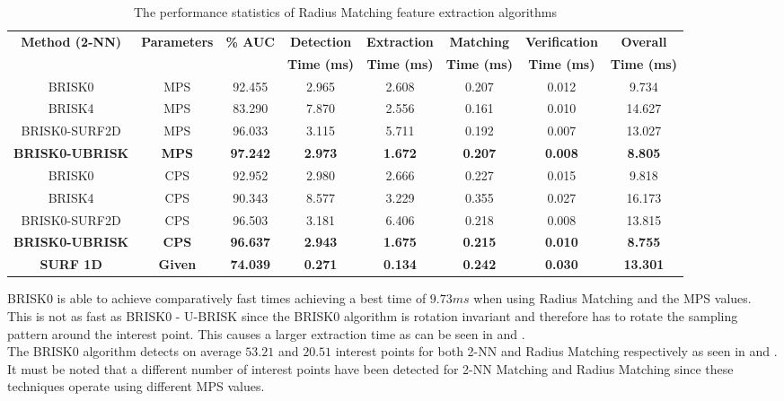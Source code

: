 \documentclass{report}
\begin{document}
\begin{table}
\centering
\caption{The performance statistics of Radius Matching feature extraction algorithms}
\footnotesize
\begin{tabular}{|c|c|c|c|c|c|c|c|}
\hline 
\textbf{Method (2-NN)} & \textbf{Parameters} & \textbf{\% AUC} & \textbf{Detection} & \textbf{Extraction} & \textbf{Matching} & \textbf{Verification} & \textbf{Overall}\tabularnewline
 &  &  & \textbf{Time (ms)} & \textbf{Time (ms)} & \textbf{Time (ms)} & \textbf{Time (ms)} & \textbf{Time (ms)}\tabularnewline
\hline 
\hline 
BRISK0 & MPS & 92.455 & 2.965 & 2.608 & 0.207 & 0.012 & 9.734\tabularnewline
\hline 
BRISK4 & MPS & 83.290 & 7.870 & 2.556 & 0.161 & 0.010 & 14.627\tabularnewline
\hline 
BRISK0-SURF2D & MPS & 96.033 & 3.115 & 5.711 & 0.192 & 0.007 & 13.027\tabularnewline
\hline 
\textbf{BRISK0-UBRISK} & \textbf{MPS} & \textbf{97.242} & \textbf{2.973} & \textbf{1.672} & \textbf{0.207} & \textbf{0.008} & \textbf{8.805}\tabularnewline
\hline 
BRISK0 & CPS & 92.952 & 2.980 & 2.666 & 0.227 & 0.015 & 9.818\tabularnewline
\hline 
BRISK4 & CPS & 90.343 & 8.577 & 3.229 & 0.355 & 0.027 & 16.173\tabularnewline
\hline 
BRISK0-SURF2D & CPS & 96.503 & 3.181 & 6.406 & 0.218 & 0.008 & 13.815\tabularnewline
\hline 
\textbf{BRISK0-UBRISK} & \textbf{CPS} & \textbf{96.637} & \textbf{2.943} & \textbf{1.675} & \textbf{0.215} & \textbf{0.010} & \textbf{8.755}\tabularnewline
\hline 
\textbf{SURF 1D} & \textbf{Given} & \textbf{74.039} & \textbf{0.271} & \textbf{0.134} & \textbf{0.242} & \textbf{0.030} & \textbf{13.301}\tabularnewline
\hline 
\end{tabular}
\label{tab:mrd_times_hamming}
\end{table}

BRISK0 is able to achieve comparatively fast times achieving a best time of $9.73 ms$ when using Radius Matching and the MPS values. This is not as fast as BRISK0 - U-BRISK since the BRISK0 algorithm is rotation invariant and therefore has to rotate the sampling pattern around the interest point. This causes a larger extraction time as can be seen in  and .\\

The BRISK0 algorithm detects on average $53.21$ and $20.51$ interest points for both 2-NN and Radius Matching respectively as seen in  and . It must be noted that a different number of interest points have been detected for 2-NN Matching and Radius Matching since these techniques operate using different MPS values. \\
\end{document}
